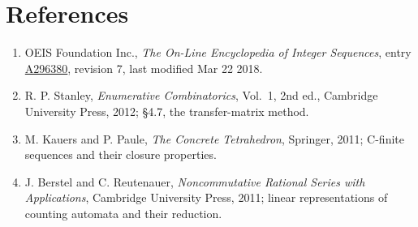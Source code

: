 \documentclass[11pt]{article}
\theoremstyle{definition}
\begin{document}
\section{References}

\begin{enumerate}

\item OEIS Foundation Inc., \emph{The On-Line Encyclopedia of Integer Sequences}, entry \href{https://oeis.org/A296380}{A296380}, revision 7, last modified Mar 22 2018.

\item R. P. Stanley, \emph{Enumerative Combinatorics}, Vol.~1, 2nd ed., Cambridge University Press, 2012; \S4.7, the transfer-matrix method.

\item M. Kauers and P. Paule, \emph{The Concrete Tetrahedron}, Springer, 2011; C-finite sequences and their closure properties.

\item J. Berstel and C. Reutenauer, \emph{Noncommutative Rational Series with Applications}, Cambridge University Press, 2011; linear representations of counting automata and their reduction.

\end{enumerate}
\end{document}
